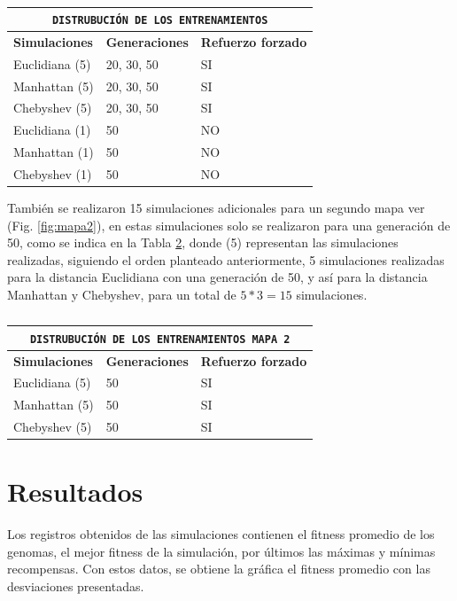 \documentclass[lettersize, journal]{IEEEtran}
\begin{document}
\begin{table}
\centering
\caption{}
\label{tab:fds_1}
\begin{tabular}{lll}
\multicolumn{3}{c}{\texttt{DISTRUBUCIÓN DE LOS ENTRENAMIENTOS}}
\\
\toprule
\textbf{Simulaciones} & 
\textbf{Generaciones}  &
\textbf{Refuerzo forzado}\\
\midrule
Euclidiana (5)   &  20, 30, 50 & SI\\
Manhattan (5)     &  20, 30, 50 & SI\\
Chebyshev (5)     &  20, 30, 50 & SI\\
\bottomrule
Euclidiana (1)    & 50 & NO\\
Manhattan (1)     & 50 & NO\\
Chebyshev  (1)    & 50 & NO\\
\bottomrule
\end{tabular}
\end{table}

También se realizaron 15 simulaciones adicionales para un segundo mapa ver (Fig. \ref{fig:mapa2}), en estas simulaciones solo se realizaron para una generación de 50, como se indica en la Tabla \ref{tab:fds_2}, donde (5) representan las simulaciones realizadas, siguiendo el orden planteado anteriormente, 5 simulaciones realizadas para la distancia Euclidiana con una generación de 50, y así para la distancia Manhattan y Chebyshev, para un total de $5*3=15$ simulaciones.

\begin{table}
\centering
\caption{}
\label{tab:fds_2}
\begin{tabular}{lll}
\multicolumn{3}{c}{\texttt{DISTRUBUCIÓN DE LOS ENTRENAMIENTOS MAPA 2}}
\\
\toprule
\textbf{Simulaciones} & 
\textbf{Generaciones}  &
\textbf{Refuerzo forzado}\\
\midrule
Euclidiana (5)   &50 & SI\\
Manhattan (5)     &50 & SI\\
Chebyshev (5)     &50 & SI\\
\bottomrule
\end{tabular}
\end{table}


\section{Resultados}
Los registros obtenidos de las simulaciones contienen el fitness promedio de los genomas, el mejor fitness de la simulación, por últimos las máximas y mínimas recompensas. Con estos datos, se obtiene la gráfica el fitness promedio con las desviaciones presentadas.
\end{document}
